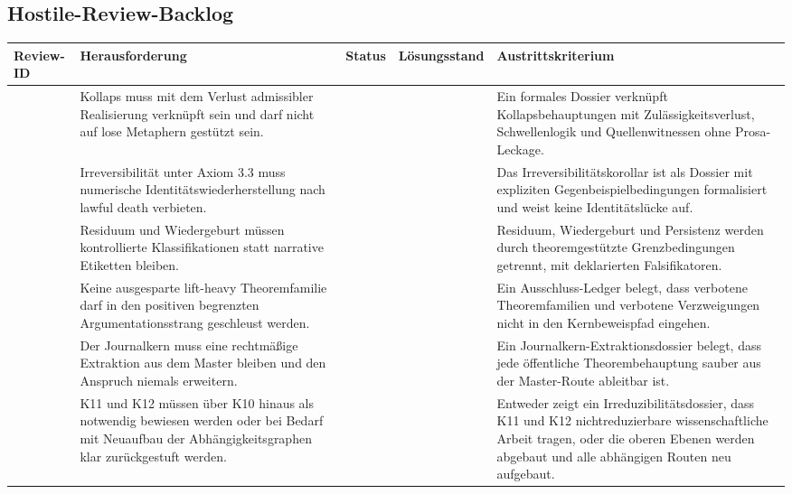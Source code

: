 \subsection{Hostile-Review-Backlog}
\begin{center}
\begin{tabular}{@{}L{0.18\textwidth}L{0.25\textwidth}L{0.11\textwidth}L{0.15\textwidth}L{0.23\textwidth}@{}}
\toprule
Review-ID & Herausforderung & Status & Lösungsstand & Austrittskriterium \\
\midrule
{} & Kollaps muss mit dem Verlust admissibler Realisierung verknüpft sein und darf nicht auf lose Metaphern gestützt sein. &  &  & Ein formales Dossier verknüpft Kollapsbehauptungen mit Zulässigkeitsverlust, Schwellenlogik und Quellenwitnessen ohne Prosa-Leckage. \\
 & Irreversibilität unter Axiom 3.3 muss numerische Identitätswiederherstellung nach lawful death verbieten. &  &  & Das Irreversibilitätskorollar ist als Dossier mit expliziten Gegenbeispielbedingungen formalisiert und weist keine Identitätslücke auf. \\
 & Residuum und Wiedergeburt müssen kontrollierte Klassifikationen statt narrative Etiketten bleiben. &  &  & Residuum, Wiedergeburt und Persistenz werden durch theoremgestützte Grenzbedingungen getrennt, mit deklarierten Falsifikatoren. \\
 & Keine ausgesparte lift-heavy Theoremfamilie darf in den positiven begrenzten Argumentationsstrang geschleust werden. &  &  & Ein Ausschluss-Ledger belegt, dass verbotene Theoremfamilien und verbotene Verzweigungen nicht in den Kernbeweispfad eingehen. \\
 & Der Journalkern muss eine rechtmäßige Extraktion aus dem Master bleiben und den Anspruch niemals erweitern. &  &  & Ein Journalkern-Extraktionsdossier belegt, dass jede öffentliche Theorembehauptung sauber aus der Master-Route ableitbar ist. \\
 & K11 und K12 müssen über K10 hinaus als notwendig bewiesen werden oder bei Bedarf mit Neuaufbau der Abhängigkeitsgraphen klar zurückgestuft werden. &  &  & Entweder zeigt ein Irreduzibilitätsdossier, dass K11 und K12 nichtreduzierbare wissenschaftliche Arbeit tragen, oder die oberen Ebenen werden abgebaut und alle abhängigen Routen neu aufgebaut. \\
\bottomrule
\end{tabular}
\end{center}

